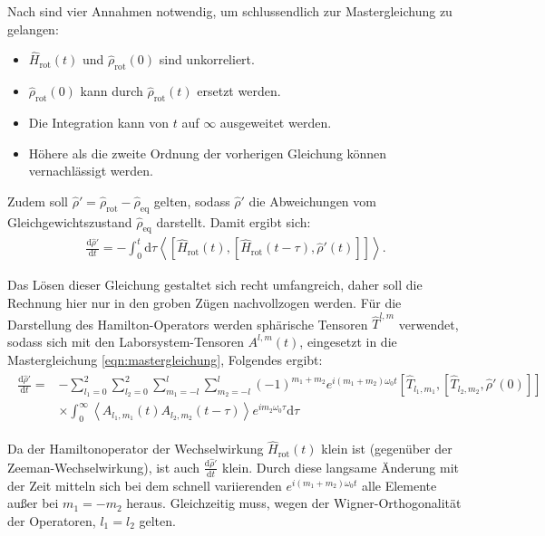 Nach \cite[S. 276]{spiess} sind vier Annahmen notwendig, um schlussendlich zur Mastergleichung zu gelangen:
\begin{itemize}
\item $\hat{H}_\text{rot}(t)$ und $\hat{\rho}_\text{rot}(0)$ sind unkorreliert.
\item $\hat{\rho}_\text{rot}(0)$ kann durch $\hat{\rho}_\text{rot}(t)$ ersetzt werden.
\item Die Integration kann von $t$ auf $\infty$ ausgeweitet werden.
\item Höhere als die zweite Ordnung der vorherigen Gleichung können vernachlässigt werden.
\end{itemize}
Zudem soll $\hat{\rho}' = \hat{\rho}_\text{rot} - \hat{\rho}_\text{eq}$ gelten, sodass $\hat{\rho}'$ die Abweichungen vom Gleichgewichtszustand $\hat{\rho}_\text{eq}$ darstellt.
Damit ergibt sich:
\begin{align}
    \frac{\text{d} \hat{\rho}'}{\text{d}t} = - \int_0^t \text{d} \tau \left< \left[\hat{H}_\text{rot}(t), [\hat{H}_\text{rot}(t-\tau), \hat{\rho}'(t)] \right] \right>. \label{eqn:mastergleichung}
\end{align}

Das Lösen dieser Gleichung gestaltet sich recht umfangreich, daher soll die Rechnung hier nur in den groben Zügen nachvollzogen werden.
Für die Darstellung des Hamilton-Operators werden sphärische Tensoren $\hat{T}^{l,m}$ verwendet, sodass sich mit den Laborsystem-Tensoren $A^{l,m}(t)$, eingesetzt in die Mastergleichung \eqref{eqn:mastergleichung}, Folgendes ergibt:
\begin{align}
\begin{split}
    \frac{\text{d} \hat{\rho}'}{\text{d}t} =& -\sum_{l_1 = 0}^2 \sum_{l_2 = 0}^2 \sum_{m_1 = -l}^l \sum_{m_2 = -l}^l (-1)^{m_1+m_2} e^{i(m_1+m_2) \omega_0 t} \left[\hat{T}_{l_1,m_1}, [\hat{T}_{l_2,m_2}, \hat{\rho}'(0)] \right] \\ &\times \int_0^\infty \left< A_{l_1,m_1}(t) A_{l_2,m_2}(t-\tau) \right> e^{i m_2 \omega_0 \tau} \text{d} \tau
\end{split}
\end{align}

Da der Hamiltonoperator der Wechselwirkung $\hat{H}_\text{rot}(t)$ klein ist (gegenüber der Zeeman-Wechselwirkung), ist auch $\frac{\text{d} \hat{\rho}'}{\text{d}t}$ klein. Durch diese langsame Änderung mit der Zeit mitteln sich bei dem schnell variierenden $e^{i(m_1+m_2) \omega_0 t}$ alle Elemente außer bei $m_1 = - m_2$ heraus. Gleichzeitig muss, wegen der Wigner-Orthogonalität der Operatoren, $l_1 = l_2$ gelten.

